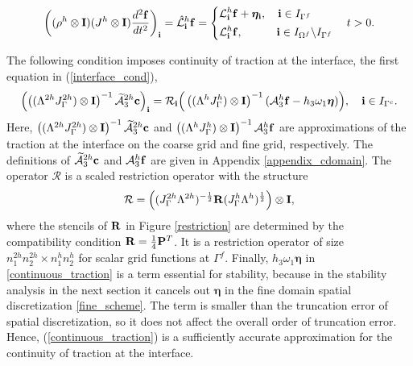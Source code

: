 {{%
\begin{align}\label{fine_scheme}
\left(({\rho}^h\otimes{\bf I})(J^h\otimes{\bf I})\frac{d^2{\bf f}}{dt^2}\right)_{\bf i} = \hat{\mathcal{L}}^h_{\bf i}{\bf f} = \left\{
\begin{aligned}
&\mathcal{L}^h_{\bf i}{\bf f} +{\bm \eta}_{\bf i}, \quad {\bf i}\in I_{\Gamma^f}\\
&\mathcal{L}^h_{\bf i}{\bf f},\quad\quad\quad {\bf i}\in I_{\Omega^f}\backslash I_{\Gamma^f} 
\end{aligned}
\right. \quad t > 0.
\end{align}

The following condition imposes continuity of traction at the interface, the first equation in (\ref{interface_cond}),
\begin{equation}\label{continuous_traction}
\left(\left((\Lambda^{2h}J_{\Gamma}^{2h})\otimes{\bf I}\right)^{-1}\widetilde{\mathcal{A}}_3^{2h}{\bf c}\right)_{\bf i}
= {\mathcal{R}}_{\bf i}\Big(\left((\Lambda^hJ_{\Gamma}^h)\otimes{\bf I}\right)^{-1}(\mathcal{A}_3^h{\bf f}-h_3\omega_1{\bm \eta})\Big), \quad {\bf i}\in I_{\Gamma^c}.
\end{equation}
Here,  $\left((\Lambda^{2h}J_{\Gamma}^{2h})\otimes{\bf I}\right)^{-1}\widetilde{\mathcal{A}}_3^{2h}{\bf c}$ and $\left((\Lambda^hJ_{\Gamma}^h)\otimes{\bf I}\right)^{-1}\mathcal{A}_3^h{\bf f}$ are approximations of the traction at the interface on the coarse grid and fine grid, respectively. The definitions of $\widetilde{\mathcal{A}}_3^{2h}{\bf c}$ and $\mathcal{A}_3^{h}{\bf f}$ are given in Appendix \ref{appendix_cdomain}. The operator $\mathcal{R}$ is a scaled restriction operator with the structure 
\begin{equation}\label{scaleR}
 {\mathcal{R}} =  \left(({J}^{2h}_\Gamma{\Lambda}^{2h})^{-\frac{1}{2}}{\bf R}({J}^{h}_\Gamma {\Lambda}^h)^{\frac{1}{2}}\right)\otimes {\bf I},
 \end{equation}
 where the stencils of ${\bf R}$  in Figure \ref{restriction} are determined by the compatibility condition ${\bf R}=\frac{1}{4}{\bf P}^T$. It is a restriction operator of size $n_1^{2h}n_2^{2h}\times n_1^hn_2^h$ for scalar grid functions at $\Gamma^f$.   Finally, $h_3\omega_1{\bm \eta}$ in \eqref{continuous_traction} is a term essential for stability, because in the stability analysis in the next section it cancels out ${\bm \eta}$ in the fine domain spatial discretization \eqref{fine_scheme}. The term is smaller than the truncation error of spatial discretization, so it does not affect the overall order of truncation error. Hence, (\ref{continuous_traction})  is a sufficiently accurate approximation for the continuity of traction at the interface.  
}}

